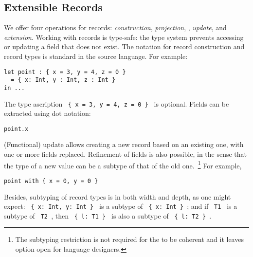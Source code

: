 {%

\subsection{Extensible Records}




We offer four operations for records: \emph{construction}, \emph{projection}, ,
\emph{update}, and \emph{extension}. Working with records is type-safe: the type
system prevents accessing or updating a field that does not exist. The notation
for record construction and record types is standard in the source language. For
example:
\begin{lstlisting}
let point : { x = 3, y = 4, z = 0 } 
  = { x: Int, y : Int, z : Int } 
in ...
\end{lstlisting}
The type ascription \lstinline$ { x = 3, y = 4, z = 0 } $ is optional. Fields
can be extracted using dot notation:
\begin{lstlisting}
point.x
\end{lstlisting}
(Functional) update allows creating a new record based on an existing one, with
one or more fields replaced. Refinement of fields is also possible, in the sense
that the type of a new value can be a subtype of that of the old
one.~\footnote{The subtyping restriction is not required for the \name to be
  coherent and it leaves option open for language designers.} For example,
\begin{lstlisting}
point with { x = 0, y = 0 }
\end{lstlisting}
Besides, subtyping of record types is in both width and depth, as one might
expect: \lstinline$ { x: Int, y: Int } $ is a subtype of
\lstinline$ { x: Int } $; and if \lstinline$ T1 $ is a subtype of
\lstinline$ T2 $, then \lstinline$ { l: T1 } $ is also a subtype of
\lstinline$ { l: T2 } $.

}
